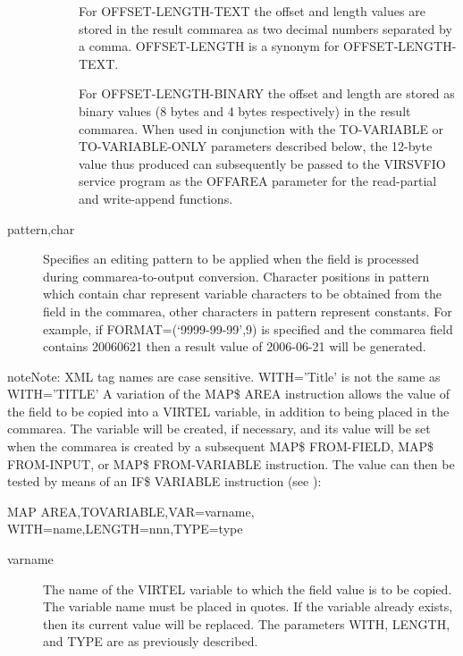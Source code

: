 \documentclass[letterpaper,10pt,english]{sphinxmanual}
\begin{document}
\begin{description}
\begin{description}
For OFFSET-LENGTH-TEXT the offset and length values are stored in the result commarea as two decimal numbers separated by a comma. OFFSET-LENGTH is a synonym for OFFSET-LENGTH-TEXT.

For OFFSET-LENGTH-BINARY the offset and length are stored as binary values (8 bytes and 4 bytes respectively) in the result commarea. When used in conjunction with the TO-VARIABLE or TO-VARIABLE-ONLY
parameters described below, the 12-byte value thus produced can subsequently be passed to the VIRSVFIO service program as the OFFAREA parameter for the read-partial and write-append functions.

\end{description}

\item[{pattern,char}] \leavevmode
Specifies an editing pattern to be applied when the field is processed during commarea-to-output conversion. Character positions in pattern which contain char represent variable characters to be obtained from the field in the commarea, other characters in pattern represent constants. For example, if FORMAT=(‘9999-99-99’,9) is specified and the commarea field contains 20060621 then a result value of
2006-06-21 will be generated.

\end{description}

\begin{sphinxadmonition}{note}{Note:}
XML tag names are case sensitive. WITH=’Title’ is not the same as WITH=’TITLE’ A variation of the MAP\$ AREA instruction allows the value of the field to be copied into a VIRTEL variable, in addition to being placed in the commarea. The variable will be created, if necessary, and its value will be set when the commarea is created by a subsequent MAP\$ FROM-FIELD, MAP\$ FROM-INPUT, or MAP\$ FROM-VARIABLE instruction. The value can then be tested by means of an IF\$ VARIABLE instruction (see {\hyperref[\detokenize{User_Guide:v457ug-virtel-scenarios}]{}}):
\end{sphinxadmonition}

\begin{sphinxVerbatim}[commandchars=\\\{\}]
MAP\PYGZdl{} AREA,TO\PYGZhy{}VARIABLE,VAR=\PYGZsq{}varname\PYGZsq{},
    WITH=\PYGZsq{}name\PYGZsq{},LENGTH=nnn,TYPE=type
\end{sphinxVerbatim}
\begin{description}
\item[{varname}] \leavevmode
The name of the VIRTEL variable to which the field value is to be copied. The variable name must be placed in quotes. If the variable already exists, then its current value will be replaced. The parameters WITH, LENGTH, and TYPE are as previously described.

\end{description}
\end{document}
